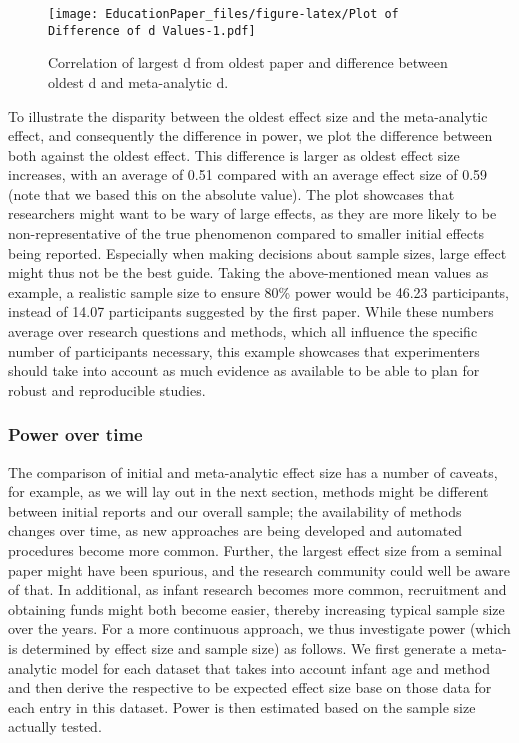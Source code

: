 \documentclass[english,floatsintext,man]{apa6}
\begin{document}
\begin{figure}[htbp]
\centering
\texttt{[image: EducationPaper\_files/figure-latex/Plot of Difference of d Values-1.pdf]}
\caption{Correlation of largest d from oldest paper and difference
between oldest d and meta-analytic d.}
\end{figure}

To illustrate the disparity between the oldest effect size and the
meta-analytic effect, and consequently the difference in power, we plot
the difference between both against the oldest effect. This difference
is larger as oldest effect size increases, with an average of 0.51
compared with an average effect size of 0.59 (note that we based this on
the absolute value). The plot showcases that researchers might want to
be wary of large effects, as they are more likely to be
non-representative of the true phenomenon compared to smaller initial
effects being reported. Especially when making decisions about sample
sizes, large effect might thus not be the best guide. Taking the
above-mentioned mean values as example, a realistic sample size to
ensure 80\% power would be 46.23 participants, instead of 14.07
participants suggested by the first paper. While these numbers average
over research questions and methods, which all influence the specific
number of participants necessary, this example showcases that
experimenters should take into account as much evidence as available to
be able to plan for robust and reproducible studies.

\subsubsection{Power over time}\label{power-over-time}

The comparison of initial and meta-analytic effect size has a number of
caveats, for example, as we will lay out in the next section, methods
might be different between initial reports and our overall sample; the
availability of methods changes over time, as new approaches are being
developed and automated procedures become more common. Further, the
largest effect size from a seminal paper might have been spurious, and
the research community could well be aware of that. In additional, as
infant research becomes more common, recruitment and obtaining funds
might both become easier, thereby increasing typical sample size over
the years. For a more continuous approach, we thus investigate power
(which is determined by effect size and sample size) as follows. We
first generate a meta-analytic model for each dataset that takes into
account infant age and method and then derive the respective to be
expected effect size base on those data for each entry in this dataset.
Power is then estimated based on the sample size actually tested.
\end{document}
